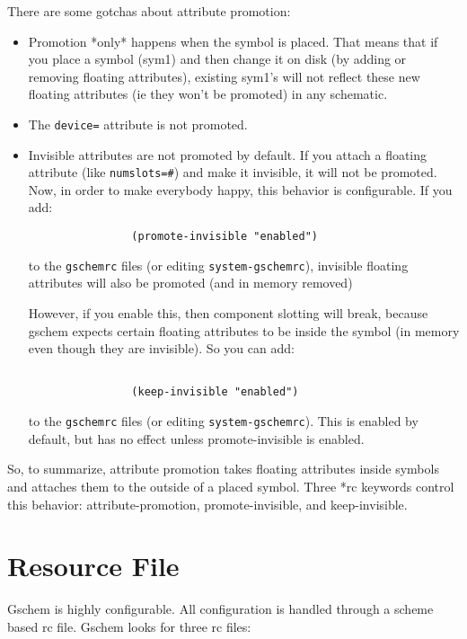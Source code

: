 \documentclass{article}
\begin{document}
There are some gotchas about attribute promotion:
\begin{itemize}
\item Promotion *only* happens when the symbol is placed.  That means
that if you place a symbol (sym1) and then change it on disk (by
adding or removing floating attributes), existing sym1's will not
reflect these new floating attributes (ie they won't be promoted) in
any schematic.

\item The {\tt device=} attribute is not promoted. 

\item Invisible attributes are not promoted by default.  If you attach
a floating attribute (like {\tt numslots=\#}) and make it invisible, it will
not be promoted.  Now, in order to make everybody happy, this behavior
is configurable.  If you add:
\begin{verbatim}
                (promote-invisible "enabled")
\end{verbatim}
to the {\tt *gschemrc} files (or editing {\tt system-gschemrc}),
invisible floating attributes will also be promoted (and in memory
removed)

However, if you enable this, then component slotting will break,
because gschem expects certain floating attributes to be inside the
symbol (in memory even though they are invisible).  So you can add:
\begin{verbatim}

                (keep-invisible "enabled")
\end{verbatim}
to the {\tt *gschemrc} files (or editing {\tt system-gschemrc}).  This is enabled
by default, but has no effect unless promote-invisible is enabled.
\end{itemize}

So, to summarize, attribute promotion takes floating attributes inside
symbols and attaches them to the outside of a placed symbol.  Three
*rc keywords control this behavior: attribute-promotion,
promote-invisible, and keep-invisible.

\section{Resource File}
Gschem is highly configurable.  All configuration is handled through
a scheme based rc file.  Gschem looks for three rc files:
\end{document}
